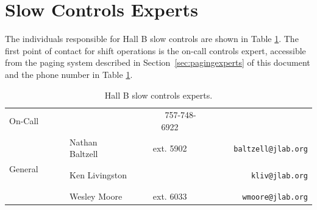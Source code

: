 \documentclass[amsmath,amssymb,notitlepage,11pt]{revtex4}
\begin{document}
\section{Slow Controls Experts}
The individuals responsible for Hall B slow controls are shown in Table \ref{tab:experts}.  The first point of contact for shift operations is the on-call controls expert, accessible from the paging system described in Section~\ref{sec:pagingexperts} of this document and the phone number in Table \ref{tab:experts}.

\begin{table}[htbp]\centering
    \begin{tabular}{llcr}\toprule[1.5pt]
        On-Call & & \ \ \ \ \ 757-748-6922 & \\ \cmidrule[0.5pt]{1-4}
         & Nathan Baltzell & ext. 5902 & \ \ \ \ \ \texttt{baltzell@jlab.org} \\
         General \ \ \ \ \       & Ken Livingston  &           & \texttt{kliv@jlab.org} \\
                & Wesley Moore & ext. 6033 &  \texttt{wmoore@jlab.org} \\
        \bottomrule[1.5pt]
    \end{tabular}
    \caption{Hall B slow controls experts.\label{tab:experts}}
\end{table}

%
\end{document}
